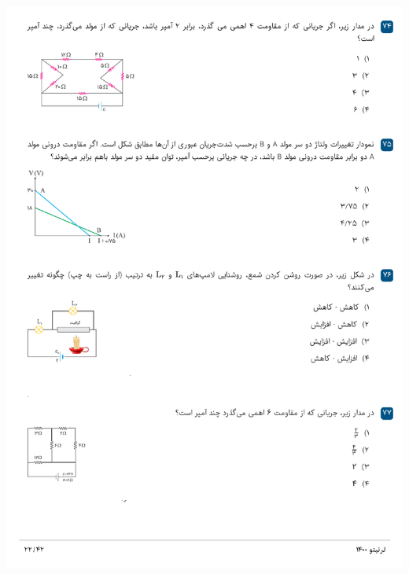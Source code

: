 \documentclass{book}
\begin{document}
\includegraphics[width=\textwidth]{"pages/22"}
\end{document}
